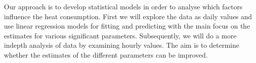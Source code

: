 \noindent Our approach is to develop statistical models in order to analyse which factors influence the heat consumption. First we will explore the data as daily values and use linear regression models for fitting and predicting with the main focus on the estimates for various significant parameters. Subsequently, we will do a more indepth analysis of data by examining hourly values. The aim is to determine whether the estimates of the different parameters can be improved. 
